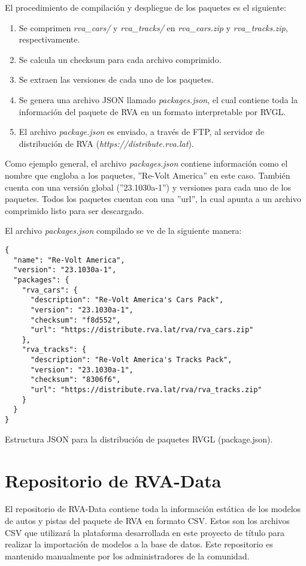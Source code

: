 El procedimiento de compilación y despliegue de los paquetes es el siguiente:
\begin{enumerate}
  \item Se comprimen \textit{rva\_cars/} y \textit{rva\_tracks/} en \textit{rva\_cars.zip} y \textit{rva\_tracks.zip}, respectivamente.
  \item Se calcula un checksum para cada archivo comprimido.
  \item Se extraen las versiones de cada uno de los paquetes.
  \item Se genera una archivo JSON llamado \textit{packages.json}, el cual contiene toda la información del paquete de RVA en un formato interpretable por RVGL.
  \item El archivo \textit{package.json} es enviado, a través de FTP, al servidor de distribución de RVA (\textit{https://distribute.rva.lat}).
\end{enumerate}

Como ejemplo general, el archivo \textit{packages.json} contiene información como el nombre que engloba a los paquetes, ''Re-Volt America'' en este caso. También cuenta con una versión global (''23.1030a-1'') y versiones para cada uno de los paquetes. Todos los paquetes cuentan con una ''url'', la cual apunta a un archivo comprimido listo para ser descargado.

El archivo \textit{packages.json} compilado se ve de la siguiente manera:

\begin{longlisting}
  \begin{verbatim}  
{
  "name": "Re-Volt America",
  "version": "23.1030a-1",
  "packages": {
    "rva_cars": {
      "description": "Re-Volt America's Cars Pack",
      "version": "23.1030a-1",
      "checksum": "f8d552",
      "url": "https://distribute.rva.lat/rva/rva_cars.zip"
    },
    "rva_tracks": {
      "description": "Re-Volt America's Tracks Pack",
      "version": "23.1030a-1",
      "checksum": "8306f6",
      "url": "https://distribute.rva.lat/rva/rva_tracks.zip"
    }
  }
}
  \end{verbatim}
  \caption[Esquema de Paquetes RVGL]{Estructura JSON para la distribución de paquetes RVGL (package.json).}
\end{longlisting}

\newpage

\section{Repositorio de RVA-Data}
El repositorio de RVA-Data contiene toda la información estática de los modelos de autos y pistas del paquete de RVA en formato CSV. Estos son los archivos CSV que utilizará la plataforma desarrollada en este proyecto de título para realizar la importación de modelos a la base de datos. Este repositorio es mantenido manualmente por los administradores de la comunidad.

